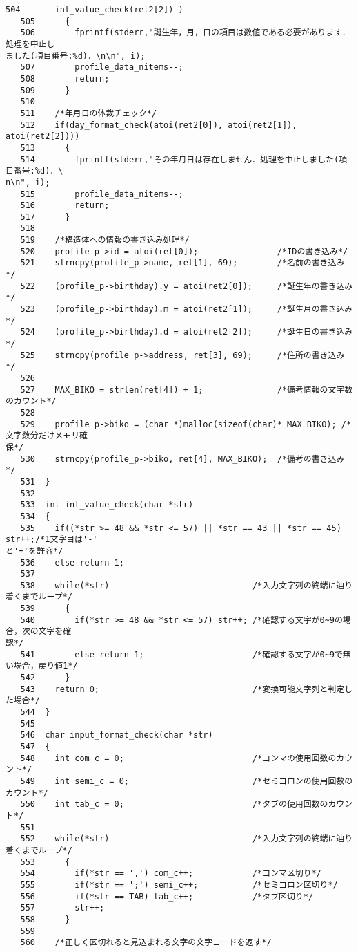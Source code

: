 \begin{Verbatim}[fontsize=\small, baselinestretch=0.8]
   504	     int_value_check(ret2[2]) )
   505	    {
   506	      fprintf(stderr,"誕生年，月，日の項目は数値である必要があります．処理を中止し
ました(項目番号:%d)．\n\n", i);
   507	      profile_data_nitems--;
   508	      return;
   509	    }
   510	
   511	  /*年月日の体裁チェック*/
   512	  if(day_format_check(atoi(ret2[0]), atoi(ret2[1]), atoi(ret2[2])))
   513	    {
   514	      fprintf(stderr,"その年月日は存在しません．処理を中止しました(項目番号:%d)．\
n\n", i);
   515	      profile_data_nitems--;
   516	      return;
   517	    }
   518	
   519	  /*構造体への情報の書き込み処理*/
   520	  profile_p->id = atoi(ret[0]);                /*IDの書き込み*/
   521	  strncpy(profile_p->name, ret[1], 69);        /*名前の書き込み*/
   522	  (profile_p->birthday).y = atoi(ret2[0]);     /*誕生年の書き込み*/
   523	  (profile_p->birthday).m = atoi(ret2[1]);     /*誕生月の書き込み*/
   524	  (profile_p->birthday).d = atoi(ret2[2]);     /*誕生日の書き込み*/
   525	  strncpy(profile_p->address, ret[3], 69);     /*住所の書き込み*/
   526	
   527	  MAX_BIKO = strlen(ret[4]) + 1;               /*備考情報の文字数のカウント*/
   528	
   529	  profile_p->biko = (char *)malloc(sizeof(char)* MAX_BIKO); /*文字数分だけメモリ確
保*/
   530	  strncpy(profile_p->biko, ret[4], MAX_BIKO);  /*備考の書き込み*/
   531	}
   532	
   533	int int_value_check(char *str)
   534	{
   535	  if((*str >= 48 && *str <= 57) || *str == 43 || *str == 45) str++;/*1文字目は'-'
と'+'を許容*/
   536	  else return 1;
   537	
   538	  while(*str)                             /*入力文字列の終端に辿り着くまでループ*/
   539	    {
   540	      if(*str >= 48 && *str <= 57) str++; /*確認する文字が0~9の場合，次の文字を確
認*/
   541	      else return 1;                      /*確認する文字が0~9で無い場合，戻り値1*/
   542	    }
   543	  return 0;                               /*変換可能文字列と判定した場合*/
   544	}
   545	
   546	char input_format_check(char *str)
   547	{
   548	  int com_c = 0;                          /*コンマの使用回数のカウント*/
   549	  int semi_c = 0;                         /*セミコロンの使用回数のカウント*/
   550	  int tab_c = 0;                          /*タブの使用回数のカウント*/
   551	
   552	  while(*str)                             /*入力文字列の終端に辿り着くまでループ*/
   553	    {
   554	      if(*str == ',') com_c++;            /*コンマ区切り*/
   555	      if(*str == ';') semi_c++;           /*セミコロン区切り*/
   556	      if(*str == TAB) tab_c++;            /*タブ区切り*/
   557	      str++;
   558	    }
   559	    
   560	  /*正しく区切れると見込まれる文字の文字コードを返す*/

\end{Verbatim}

